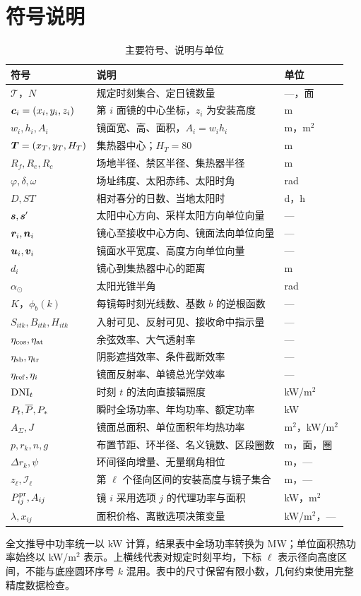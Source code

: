 \section{符号说明}
\begin{table}[H]\centering\small
\caption{主要符号、说明与单位}
\begin{tabular}{p{30mm}p{95mm}p{20mm}}\toprule
符号 & 说明 & 单位\\\midrule
$\mathcal T$，$N$ & 规定时刻集合、定日镜数量 & ---，面\\
$\bm{c}_i=(x_i,y_i,z_i)$ & 第 $i$ 面镜的中心坐标，$z_i$ 为安装高度 & m\\
$w_i,h_i,A_i$ & 镜面宽、高、面积，$A_i=w_ih_i$ & m，m$^2$\\
$\bm{T}=(x_T,y_T,H_T)$ & 集热器中心；$H_T=80$ & m\\
$R_f,R_e,R_c$ & 场地半径、禁区半径、集热器半径 & m\\
$\varphi,\delta,\omega$ & 场址纬度、太阳赤纬、太阳时角 & rad\\
$D,ST$ & 相对春分的日数、当地太阳时 & d，h\\
$\bm{s},\bm{s}'$ & 太阳中心方向、采样太阳方向单位向量 & ---\\
$\bm{r}_i,\bm{n}_i$ & 镜心至接收中心方向、镜面法向单位向量 & ---\\
$\bm{u}_i,\bm{v}_i$ & 镜面水平宽度、高度方向单位向量 & ---\\
$d_i$ & 镜心到集热器中心的距离 & m\\
$\alpha_\odot$ & 太阳光锥半角 & rad\\
$K$，$\phi_b(k)$ & 每镜每时刻光线数、基数 $b$ 的逆根函数 & ---\\
$S_{itk},B_{itk},H_{itk}$ & 入射可见、反射可见、接收命中指示量 & ---\\
$\eta_{\rm cos},\eta_{\rm at}$ & 余弦效率、大气透射率 & ---\\
$\eta_{\rm sb},\eta_{\rm tr}$ & 阴影遮挡效率、条件截断效率 & ---\\
$\eta_{\rm ref},\eta_i$ & 镜面反射率、单镜总光学效率 & ---\\
$\mathrm{DNI}_t$ & 时刻 $t$ 的法向直接辐照度 & kW/m$^2$\\
$P_t,\overline{P},P_*$ & 瞬时全场功率、年均功率、额定功率 & kW\\
$A_\Sigma,J$ & 镜面总面积、单位面积年均热功率 & m$^2$，kW/m$^2$\\
$p,r_k,n,g$ & 布置节距、环半径、名义镜数、区段圈数 & m，面，圈\\
$\Delta r_k,\psi$ & 环间径向增量、无量纲角相位 & m，---\\
$z_\ell,\mathcal I_\ell$ & 第 $\ell$ 个径向区间的安装高度与镜子集合 & m，---\\
$P_{ij}^{\rm pr},A_{ij}$ & 镜 $i$ 采用选项 $j$ 的代理功率与面积 & kW，m$^2$\\
$\lambda,x_{ij}$ & 面积价格、离散选项决策变量 & kW/m$^2$，---\\
\bottomrule\end{tabular}
\end{table}
全文推导中功率统一以 kW 计算，结果表中全场功率转换为 MW；单位面积热功率始终以 kW/m$^2$ 表示。上横线代表对规定时刻平均，下标 $\ell$ 表示径向高度区间，不能与底座圆环序号 $k$ 混用。表中的尺寸保留有限小数，几何约束使用完整精度数据检查。
\pagepart
